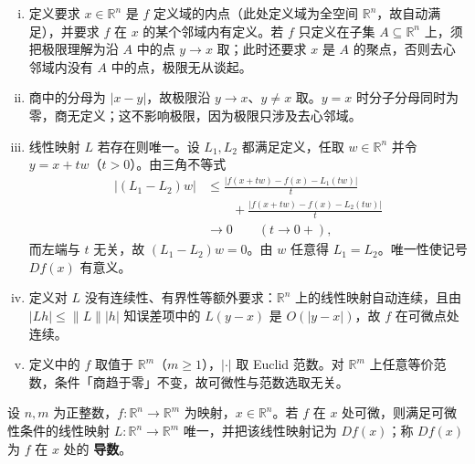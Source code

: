 \documentclass[../../main.tex]{subfiles}%
\begin{document}
\begin{remark}\label{remark:ch03-def-3-2-条件}
\begin{enumerate}[(i)]
\item 定义要求 $x\in\mathbb{R}^n$ 是 $f$ 定义域的内点（此处定义域为全空间 $\mathbb{R}^n$，故自动满足），并要求 $f$ 在 $x$ 的某个邻域内有定义。若 $f$ 只定义在子集 $A\subseteq\mathbb{R}^n$ 上，须把极限理解为沿 $A$ 中的点 $y\to x$ 取；此时还要求 $x$ 是 $A$ 的聚点，否则去心邻域内没有 $A$ 中的点，极限无从谈起。
\item 商中的分母为 $\lvert x-y\rvert$，故极限沿 $y\to x$、$y\neq x$ 取。$y=x$ 时分子分母同时为零，商无定义；这不影响极限，因为极限只涉及去心邻域。
\item 线性映射 $L$ 若存在则唯一。设 $L_1,L_2$ 都满足定义，任取 $w\in\mathbb{R}^n$ 并令 $y=x+tw$（$t>0$）。由三角不等式
\begin{align*}
\lvert (L_1-L_2)w\rvert
&\leqslant\frac{\bigl\lvert f(x+tw)-f(x)-L_1(tw)\bigr\rvert}{t}\\
&\qquad+\frac{\bigl\lvert f(x+tw)-f(x)-L_2(tw)\bigr\rvert}{t}\\
&\longrightarrow0\qquad(t\to0+),
\end{align*}
而左端与 $t$ 无关，故 $(L_1-L_2)w=0$。由 $w$ 任意得 $L_1=L_2$。唯一性使记号 $Df(x)$ 有意义。
\item 定义对 $L$ 没有连续性、有界性等额外要求：$\mathbb{R}^n$ 上的线性映射自动连续，且由 $\lvert Lh\rvert\leqslant\lVert L\rVert\lvert h\rvert$ 知误差项中的 $L(y-x)$ 是 $O(\lvert y-x\rvert)$，故 $f$ 在可微点处连续。
\item 定义中的 $f$ 取值于 $\mathbb{R}^m$（$m\geqslant1$），$\lvert\cdot\rvert$ 取 Euclid 范数。对 $\mathbb{R}^m$ 上任意等价范数，条件「商趋于零」不变，故可微性与范数选取无关。
\end{enumerate}
\end{remark}

\begin{definition*}[导数记号]\label{definition:ch03-def-3-2-导数}
设 $n,m$ 为正整数，$f:\mathbb{R}^n\to\mathbb{R}^m$ 为映射，$x\in\mathbb{R}^n$。若 $f$ 在 $x$ 处可微，则满足可微性条件的线性映射 $L:\mathbb{R}^n\to\mathbb{R}^m$ 唯一，并把该线性映射记为 $Df(x)$；称 $Df(x)$ 为 $f$ 在 $x$ 处的 \textbf{导数}。
\end{definition*}
\end{document}
